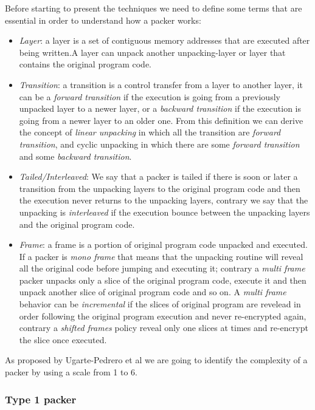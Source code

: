 Before starting to present the techniques we need to define some terms that are essential in order to understand how a packer works: 
\begin{itemize}
\item \textit{Layer}: a layer is a set of contiguous memory addresses that are executed after being written.A layer can unpack another unpacking-layer or layer that contains the original program code.
\item \textit{Transition}: a transition is a control transfer from a layer to another layer, it can be a \textit{forward transition} if the execution is going from a previously unpacked layer to a newer layer, or a \textit{backward transition} if the execution is going from a newer layer to an older one. From this definition we can derive the concept of \textit{linear unpacking} in which all the transition are \textit{forward transition}, and {cyclic unpacking} in which there are some \textit{forward transition} and some \textit{backward transition}. 
\item \textit{Tailed/Interleaved}: We say that a packer is tailed if there is soon or later a transition from the unpacking layers to the original program code and then the execution never returns to the unpacking layers, contrary we say that the unpacking is \textit{interleaved} if the execution bounce between the unpacking layers and the original program code. 
\item \textit{Frame}: a frame is a portion of original program code unpacked and executed. If a packer is \textit{mono frame} that means that the unpacking routine will reveal all the original code before jumping and executing it; contrary a \textit{multi frame} packer unpacks only a slice of the original program code, execute it and then unpack another slice of original program code and so on. A \textit{multi frame} behavior can be \textit{incremental} if the slices of original program are revelead in order following the original program execution and never re-encrypted again, contrary a \textit{shifted frames} policy reveal only one slices at times and re-encrypt the slice once executed.
\end{itemize}

As proposed by Ugarte-Pedrero et al\cite{sokpacker} we are going to identify the complexity of a packer by using a scale from 1 to 6.

\subsubsection{Type 1 packer}

